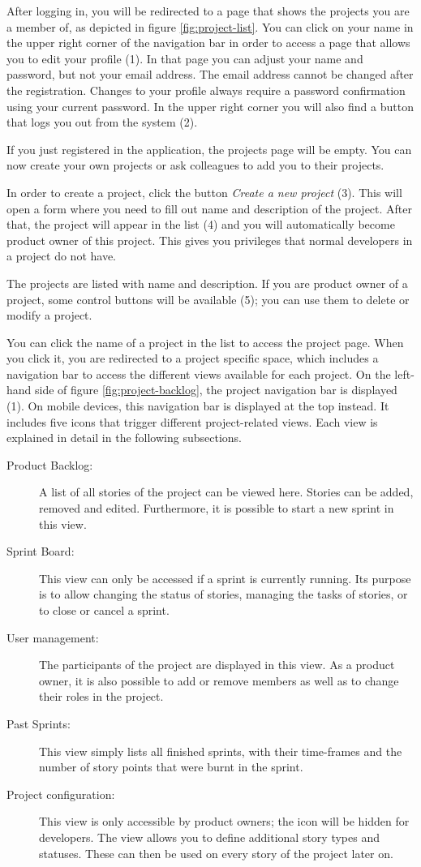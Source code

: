 \documentclass[
	accentcolor=tud1a %
]{tudreport}
\begin{document}
After logging in, you will be redirected to a page that shows the projects you are a member of, as depicted in figure \ref{fig:project-list}. You can click on your name in the upper right corner of the navigation bar in order to access a page that allows you to edit your profile (1). In that page you can adjust your name and password, but not your email address. The email address cannot be changed after the registration. Changes to your profile always require a password confirmation using your current password. In the upper right corner you will also find a button that logs you out from the system (2).

If you just registered in the application, the projects page will be empty. You can now create your own projects or ask colleagues to add you to their projects.

In order to create a project, click the button \emph{Create a new project} (3). This will open a form where you need to fill out name and description of the project. After that, the project will appear in the list (4) and you will automatically become product owner of this project. This gives you privileges that normal developers in a project do not have.

The projects are listed with name and description. If you are product owner of a project, some control buttons will be available (5); you can use them to delete or modify a project.

You can click the name of a project in the list to access the project page. When you click it, you are redirected to a project specific space, which includes a navigation bar to access the different views available for each project. On the left-hand side of figure \ref{fig:project-backlog}, the project navigation bar is displayed (1). On mobile devices, this navigation bar is displayed at the top instead. It includes five icons that trigger different project-related views. Each view is explained in detail in the following subsections.
\begin{description}
	\item[Product Backlog:] A list of all stories of the project can be viewed here. Stories can be added, removed and edited. Furthermore, it is possible to start a new sprint in this view.
	\item[Sprint Board:] This view can only be accessed if a sprint is currently running. Its purpose is to allow changing the status of stories, managing the tasks of stories, or to close or cancel a sprint.
	\item[User management:] The participants of the project are displayed in this view. As a product owner, it is also possible to add or remove members as well as to change their roles in the project.
	\item[Past Sprints:] This view simply lists all finished sprints, with their time-frames and the number of story points that were burnt in the sprint.
	\item[Project configuration:] This view is only accessible by product owners; the icon will be hidden for developers. The view allows you to define additional story types and statuses. These can then be used on every story of the project later on.
\end{description}
\end{document}
